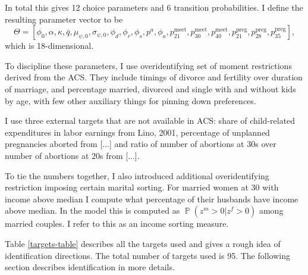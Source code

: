 \documentclass[12pt,letter]{article}
\DeclareMathOperator{\PP}{\mathbb{P}}
\renewcommand{\P}{\PP}
\begin{document}
In total this gives 12 choice parameters and 6 transition probabilities. I define the resulting parameter vector to be
\begin{equation}\label{theta-eq}
\Theta = \left[ \phi_0,\alpha,\kappa,\bar{q},\mu_{\psi,0},\sigma_{\psi,0},\phi_d,\phi_r,\phi_s,p^{a},\phi_a,p^{\text{meet}}_{21},p^{\text{meet}}_{30},p^{\text{meet}}_{40},p^{\text{preg}}_{21},p^{\text{preg}}_{28},p^{\text{preg}}_{35}\right],
\end{equation}
which is 18-dimensional. 

To discipline these parameters, I use overidentifying set of moment restrictions derived from the ACS. They include timings of divorce and fertility over duration of marriage, and percentage married, divorced and single with and without kids by age, with few other auxiliary things for pinning down preferences.

I use three external targets that are not available in ACS: share of child-related expenditures in labor earnings from Lino, 2001\nocite{lino2001expenditures}, percentage of unplanned pregnancies aborted from [...] and ratio of number of abortions at 30s over number of abortions at 20s from [...].

To tie the numbers together, I also introduced additional overidentifying restriction imposing certain marital sorting. For married women at 30 with income above median I compute what percentage of their husbands have income above median. In the model this is computed as $\P(z^m>0|z^f>0)$ among married couples. I refer to this as an income sorting measure.

Table \ref{targets-table} describes all the targets used and gives a rough idea of identification directions.  The total number of targets used is 95. The following section describes identification in more details.
\end{document}
